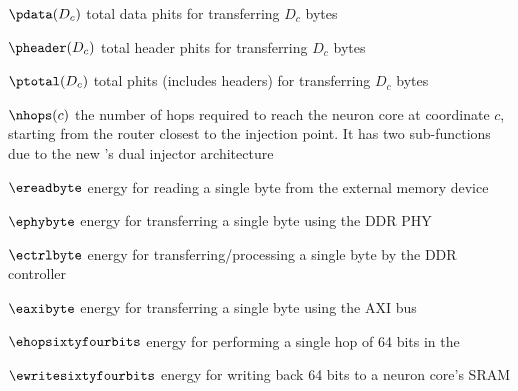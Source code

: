 \begin{eqexpl}[30mm]
    \item{$\pdata(D_c)$} total data phits for transferring $D_c$ bytes
    \item{$\pheader(D_c)$} total header phits for transferring $D_c$ bytes
    \item{$\ptotal(D_c)$} total phits (includes headers) for transferring $D_c$ bytes
    \item{$\nhops(c)$} the number of hops required to reach the neuron core at coordinate $c$, starting from the router closest to the injection point. It has two sub-functions due to the new \confignoc{}'s dual injector architecture
    \item{$\ereadbyte$} energy for reading a single byte from the external memory device
    \item{$\ephybyte$} energy for transferring a single byte using the DDR PHY
    \item{$\ectrlbyte$} energy for transferring/processing a single byte by the DDR controller
    \item{$\eaxibyte$} energy for transferring a single byte using the AXI bus
    \item{$\ehopsixtyfourbits$} energy for performing a single hop of 64 bits in the \confignoc{}
    \item{$\ewritesixtyfourbits$} energy for writing back 64 bits to a neuron core's SRAM
\end{eqexpl}

